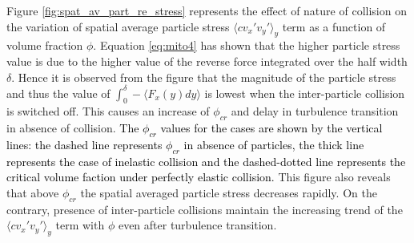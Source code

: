 \documentclass[aip,graphicx]{revtex4-1}
\begin{document}
Figure \ref{fig:spat_av_part_re_stress} represents the effect of nature of collision on the variation of spatial average particle stress $\langle c v_x' v_y'\rangle_y$ term as a function of volume fraction $\phi$. Equation \ref{eq:mito4} has shown that the higher particle stress value is due to the higher value of the reverse force integrated over the half width $\delta$. Hence it is observed from the figure that the magnitude of the particle stress and thus the value of $\int_{0}^{\delta}-\langle F_x(y)dy \rangle$ is lowest when the inter-particle collision is switched off. This  causes an increase of $\phi_{cr}$ and delay in turbulence transition in absence of collision. \textcolor{black}{The $\phi_{cr}$ values for the cases are shown by the vertical lines: the dashed line represents $\phi_{cr}$ in absence of particles, the thick line represents the case of inelastic collision and the dashed-dotted line represents the critical volume faction under perfectly elastic collision.} This figure also reveals that above $\phi_{cr}$ the spatial averaged particle stress decreases rapidly. On the contrary, presence of inter-particle collisions maintain the increasing trend of the $\langle c v_x' v_y'\rangle_y$ term with $\phi$ even after turbulence transition.
\clearpage
\end{document}
